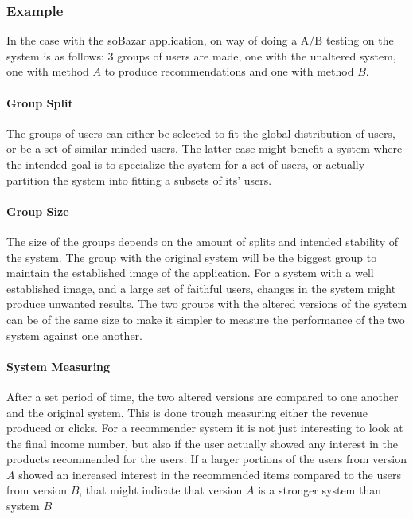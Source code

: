 \subsubsection{Example}
	In the case with the soBazar application, on way of doing a A/B testing on the system is as follows:
	3 groups of users are made, one with the unaltered system, one with method $A$ to produce recommendations and one with method $B$.

\paragraph{Group Split} %
\label{par:group_split}
	The groups of users can either be selected to fit the global distribution of users, or be a set of similar minded users.
	The latter case might benefit a system where the intended goal is to specialize the system for a set of users, or actually partition the system into fitting a subsets of its' users.

\paragraph{Group Size} %
  \label{par:group_size}
	The size of the groups depends on the amount of splits and intended stability of the system.
	The group with the original system will be the biggest group to maintain the established image of the application.
	For a system with a well established image, and a large set of faithful users, changes in the system might produce unwanted results.
	The two groups with the altered versions of the system can be of the same size to make it simpler to measure the performance of the two system against one another.

\paragraph{System Measuring} %
\label{par:system_measuring}
	After a set period of time, the two altered versions are compared to one another and the original system.
	This is done trough measuring either the revenue produced or clicks.
	For a recommender system it is not just interesting to look at the final income number, but also if the user actually showed any interest in the products recommended for the users.
	If a larger portions of the users from version $A$ showed an increased interest in the recommended items compared to the users from version $B$, that might indicate that version $A$ is a stronger system than system $B$

